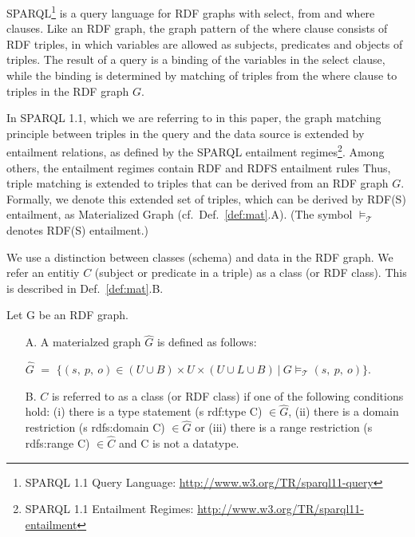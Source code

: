 \documentclass{llncs} %
\begin{document}
SPARQL\footnote{SPARQL 1.1 Query Language: \url{http://www.w3.org/TR/sparql11-query}} 
is a query language for RDF graphs with  \textsf{select}, \textsf{from} and \textsf{where} clauses.
Like an RDF graph, the graph pattern of the \textsf{where} clause consists of RDF triples, in which
variables are allowed as subjects, predicates and objects of triples.
The result of a query is a binding of the variables in the \textsf{select} clause,
while the binding is determined by matching of triples from the \textsf{where} clause
to triples in the RDF graph $G$.

In SPARQL 1.1, which we are referring to in this paper, the graph matching principle between triples in the query and the data source
is extended by entailment relations, as defined by the SPARQL entailment regimes\footnote{SPARQL 1.1 Entailment Regimes:
\url{http://www.w3.org/TR/sparql11-entailment}}. Among others, the entailment regimes contain RDF and RDFS entailment rules
Thus, triple matching is extended to triples that can be derived from an RDF graph $G$. Formally, we denote
this extended set of triples, which can be derived by RDF(S) entailment, as Materialized Graph (cf.~Def.~\ref{def:mat}.A).
(The symbol $\models_{\mathcal{T}}$ denotes RDF(S) entailment.)

We use a distinction between classes (schema) and data in the RDF graph.
We refer an entitiy $C$ (subject or predicate in a triple) as a class (or RDF class).
This is described in Def.~\ref{def:mat}.B.
 

\begin{definition}
\label{def:mat}
Let $\mathrm{G}$ be an RDF graph.
\begin{itemize}
	\item[A.]  A materialzed graph $\hat{G}$ is defined as follows:

$\hat{G}$ $=$ $\{ (s ,\ p , \ o) \in (U\cup B)\times U \times (U\cup L \cup B) \ | \ G \models_{\mathcal{T}} (s, \ p, \ o) \}  $. 

\item[B.] $C$ is referred to as a class (or RDF class) if one of the following conditions hold:
(i) there is a type statement  (s rdf:type C) $\in \hat{G}$,
 (ii) there is a domain restriction (s rdfs:domain C) $\in \hat{G}$ or 
(iii) there is a range restriction (s rdfs:range C) $\in \hat{C}$ and C is not a datatype.
\end{itemize}
\end{definition}
\end{document}
